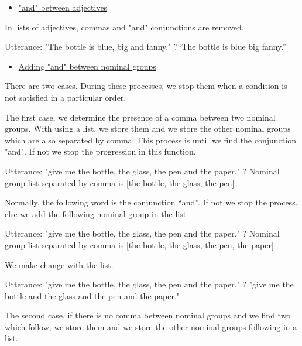\documentclass[twoside,a4paper,10pt]{report}
\begin{document}
\begin{itemize}
    \item  \underline{"and" between adjectives}
\end{itemize}
In lists of adjectives, commas and "and" conjunctions are removed.


\small
\begin{verbatimtab}
  Utterance: "The bottle is blue, big and fanny."
  ?“The bottle is blue big fanny.”
\end{verbatimtab}
\normalsize

\begin{itemize}
    \item  \underline{Adding "and" between nominal groups}
\end{itemize}
There are two cases. During these processes, we stop them when a condition is not satisfied in a particular order.

The first case, we determine the presence of a comma between two nominal groups. With using a list, we store them and we store the other nominal groups which are also separated by comma. This process is until we find the conjunction "and". If not we stop the progression in this function. 


\small
\begin{verbatimtab}
  Utterance: "give me the bottle, the glass, the pen and the paper." 
  ? Nominal group list separated by comma is [the bottle, the glass, the pen]
\end{verbatimtab}
\normalsize
Normally, the following word is the conjunction “and”. If not we stop the process, else we add the following nominal group in the list


\small
\begin{verbatimtab}
  Utterance: "give me the bottle, the glass, the pen and the paper." 
  ? Nominal group list separated by comma is [the bottle, the glass, the pen, the paper]
\end{verbatimtab}
\normalsize
We make change with the list.


\small
\begin{verbatimtab}
  Utterance: "give me the bottle, the glass, the pen and the paper." 
  ? "give me the bottle and the glass and the pen and the paper." 
\end{verbatimtab}
\normalsize

The second case, if there is no comma between nominal groups and we find two which follow, we store them and we store the other nominal groups following in a list. 
\end{document}
